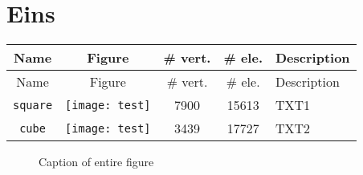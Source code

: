 \documentclass[12pt,smallheadings]{scrreprt}
\begin{document}
\chapter{Eins}
\blindtext
\begin{figure}[hp]
\centering
  \hfill
\end{figure}
\blindtext
\begin{longtable}{|ccccp{4cm}|}
\hline
Name & Figure & \# vert. & \# ele. & Description \\
\endfirsthead
Name & Figure & \# vert. & \# ele. & Description \\
\hline
\endhead
\hline
\texttt{square} & \texttt{[image: test]} & 7900 & 15613 & TXT1  \\
\hline
\texttt{cube}	&	\texttt{[image: test]} & 3439 & 17727 & TXT2 \\
 
\hline 
 
\end{longtable}
\begin{figure} 
   \caption{Caption of entire figure} \end{figure} 
   
\end{document}
